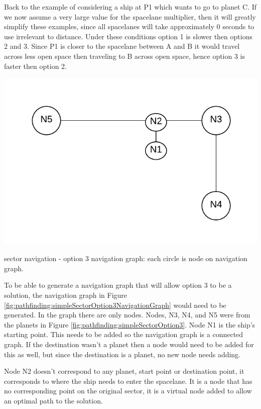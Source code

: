 Back to the example of considering a ship at P1 which wants to go to planet C.
If we now assume a very large value for the spacelane multiplier, then it will greatly simplify these examples, since all spacelanes will take approximately 0 seconds to use irrelevant to distance.
Under these conditions option 1 is slower then options 2 and 3.
Since P1 is closer to the spacelane between A and B it would travel across less open space then traveling to B across open space, hence option 3 is faster then option 2.

\begin{marginfigure}
	\includegraphics{res/pathfinding/PathFindingSectorOption3NavigationGraph.pdf}
    \caption[Sector navigation - option 3 navigation graph]{sector navigation - option 3 navigation graph: each circle is node on navigation graph.}
	\label{fig:pathfinding:simpleSectorOption3NavigationGraph}
\end{marginfigure}

To be able to generate a navigation graph that will allow option 3 to be a solution, the navigation graph in Figure \ref{fig:pathfinding:simpleSectorOption3NavigationGraph} would need to be generated.
In the graph there are only nodes. 
Nodes, N3, N4, and N5 were from the planets in Figure \ref{fig:pathfinding:simpleSectorOption3}.
Node N1 is the ship's starting point.
This needs to be added so the navigation graph is a connected graph.
If the destination wasn't a planet then a node would need to be added for this as well, but since the destination is a planet, no new node needs adding.

Node N2 doesn't correspond to any planet, start point or destination point, it corresponds to where the ship needs to enter the spacelane.
It is a node that has no corresponding point on the original sector, it is a virtual node added to allow an optimal path to the solution.

